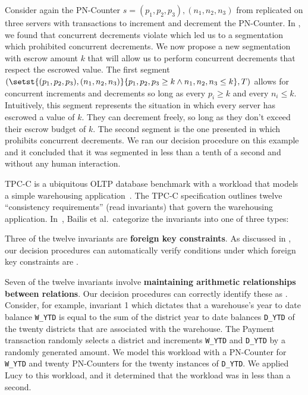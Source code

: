 Consider again the PN-Counter $s = (p_1, p_2, p_3), (n_1, n_2, n_3)$ from
 replicated on three servers with transactions
to increment and decrement the PN-Counter. In
, we found that concurrent decrements violate
\invariantconfluence{} which led us to a segmentation which prohibited
concurrent decrements. We now propose a new segmentation with escrow amount $k$
that will allow us to perform concurrent decrements that respect the escrowed
value. The first segment $(\setst{(p_1, p_2, p_3), (n_1, n_2, n_3)}{p_1, p_2,
p_3 \geq k \land n_1, n_2, n_3 \leq k}, T)$ allows for concurrent increments
and decrements so long as every $p_i \geq k$ and every $n_i \leq k$.
Intuitively, this segment represents the situation in which every server has
escrowed a value of $k$. They can decrement freely, so long as they don't
exceed their escrow budget of $k$. The second segment is the one presented in
 which prohibits concurrent decrements. We ran
our decision procedure on this example and it concluded that it was segmented
\invariantconfluent{} in less than a tenth of a second and without any human
interaction.

\example[TPC-C]
TPC-C is a ubiquitous OLTP database benchmark with a workload that models a
simple warehousing application~\cite{difallah2013oltp}. The TPC-C specification
outlines twelve ``consistency requirements'' (read invariants) that govern the
warehousing application. In~\cite{bailis2014coordination}, Bailis et al.\
categorize the invariants into one of three types:

    Three of the twelve invariants are \textbf{foreign key constraints}.  As
    discussed in \exampleref{ForeignKeysEval}, our decision procedures can
    automatically verify conditions under which foreign key constraints are
    \invariantconfluent{}.

    \newcommand{\ttt}[1]{{\smaller \texttt{#1}}} Seven of the twelve invariants
    involve \textbf{maintaining arithmetic relationships between relations}.
    Our decision procedures can correctly identify these as
    \invariantconfluent{}. Consider, for example, invariant 1 which dictates
    that a warehouse's year to date balance \ttt{W\_YTD} is equal to the sum of
    the district year to date balances \ttt{D\_YTD} of the twenty districts
    that are associated with the warehouse. The Payment transaction randomly
    selects a district and increments \ttt{W\_YTD} and \ttt{D\_YTD} by a
    randomly generated amount. We model this workload with a PN-Counter for
    \ttt{W\_YTD} and twenty PN-Counters for the twenty instances of
    \ttt{D\_YTD}. We applied Lucy to this workload, and it determined that the
    workload was \invariantconfluent{} in less than a second.

